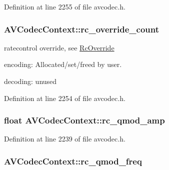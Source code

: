 Definition at line 2255 of file avcodec.\+h.

\subsubsection[{\texorpdfstring{rc\+\_\+override\+\_\+count}{rc_override_count}}]{ A\+V\+Codec\+Context\+::rc\+\_\+override\+\_\+count}\hypertarget{struct_a_v_codec_context_a5491e9920ab3df5fc32aa6de0cb03c22}{}\label{struct_a_v_codec_context_a5491e9920ab3df5fc32aa6de0cb03c22}
ratecontrol override, see \hyperlink{struct_rc_override}{Rc\+Override}
\begin{DoxyItemize}
\item encoding\+: Allocated/set/freed by user.
\item decoding\+: unused 
\end{DoxyItemize}

Definition at line 2254 of file avcodec.\+h.

\subsubsection[{\texorpdfstring{rc\+\_\+qmod\+\_\+amp}{rc_qmod_amp}}]{\setlength{\rightskip}{0pt plus 5cm}float A\+V\+Codec\+Context\+::rc\+\_\+qmod\+\_\+amp}\hypertarget{struct_a_v_codec_context_a3bb9c866147b87f945dc25290db94423}{}\label{struct_a_v_codec_context_a3bb9c866147b87f945dc25290db94423}


Definition at line 2239 of file avcodec.\+h.

\subsubsection[{\texorpdfstring{rc\+\_\+qmod\+\_\+freq}{rc_qmod_freq}}]{ A\+V\+Codec\+Context\+::rc\+\_\+qmod\+\_\+freq}\hypertarget{struct_a_v_codec_context_a0ea3bb6334a7b2bbc4e762f35ca7f473}{}\label{struct_a_v_codec_context_a0ea3bb6334a7b2bbc4e762f35ca7f473}


